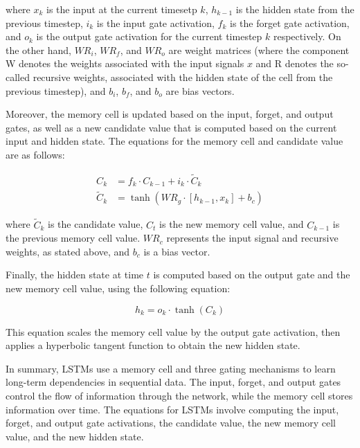 where $x_k$ is the input at the current timesetp $k$, $h_{k-1}$ is the hidden state from the previous timestep, $i_k$ is the input gate activation, $f_k$ is the forget gate activation, and $o_k$ is the output gate activation for the current timestep $k$ respectively. On the other hand, $WR_i$, $WR_f$, and $WR_o$ are weight matrices (where the component W denotes the weights associated with the input signals $x$ and R denotes the so-called recursive weights, associated with the hidden state of the cell from the previous timestep), and $b_i$, $b_f$, and $b_o$ are bias vectors.

Moreover, the memory cell is updated based on the input, forget, and output gates, as well as a new candidate value that is computed based on the current input and hidden state. The equations for the memory cell and candidate value are as follows:

\begin{equation}
\begin{split}
		C_k &= f_k \cdot C_{k-1} + i_k \cdot \tilde{C}_k \\
		\tilde{C}_k &= \tanh(WR_g \cdot [h_{k-1}, x_k] + b_c)
\end{split}
\end{equation}

where $\tilde{C}_k$ is the candidate value, $C_t$ is the new memory cell value, and $C_{k-1}$ is the previous memory cell value. $WR_c$ represents the input signal and recursive weights, as stated above, and $b_c$ is a bias vector.

Finally, the hidden state at time $t$ is computed based on the output gate and the new memory cell value, using the following equation:

\begin{equation}
	h_k = o_k \cdot \tanh(C_k)
\end{equation}

This equation scales the memory cell value by the output gate activation, then applies a hyperbolic tangent function to obtain the new hidden state.

In summary, LSTMs use a memory cell and three gating mechanisms to learn long-term dependencies in sequential data. The input, forget, and output gates control the flow of information through the network, while the memory cell stores information over time. The equations for LSTMs involve computing the input, forget, and output gate activations, the candidate value, the new memory cell value, and the new hidden state.

